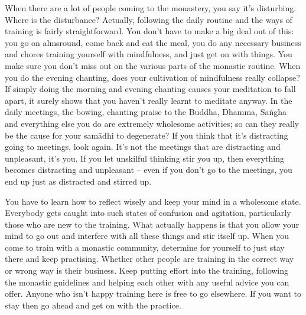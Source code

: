 When there are a lot of people coming to the monastery, you say it's disturbing. Where is the disturbance? Actually, following the daily routine and the ways of training is fairly straightforward. You don't have to make a big deal out of this: you go on almsround, come back and eat the meal, you do any necessary business and chores training yourself with mindfulness, and just get on with things. You make sure you don't miss out on the various parts of the monastic routine. When you do the evening chanting, does your cultivation of mindfulness really collapse? If simply doing the morning and evening chanting causes your meditation to fall apart, it surely shows that you haven't really learnt to meditate anyway. In the daily meetings, the bowing, chanting praise to the Buddha, Dhamma, Sa\.ngha and everything else you do are extremely wholesome activities; so can they really be the cause for your sam\=adhi to degenerate? If you think that it's distracting going to meetings, look again. It's not the meetings that are distracting and unpleasant, it's you. If you let unskilful thinking stir you up, then everything becomes distracting and unpleasant -- even if you don't go to the meetings, you end up just as distracted and stirred up. 

You have to learn how to reflect wisely and keep your mind in a wholesome state. Everybody gets caught into such states of confusion and agitation, particularly those who are new to the training. What actually happens is that you allow your mind to go out and interfere with all these things and stir itself up. When you come to train with a monastic community, determine for yourself to just stay there and keep practising. Whether other people are training in the correct way or wrong way is their business. Keep putting effort into the training, following the monastic guidelines and helping each other with any useful advice you can offer. Anyone who isn't happy training here is free to go elsewhere. If you want to stay then go ahead and get on with the practice. 

